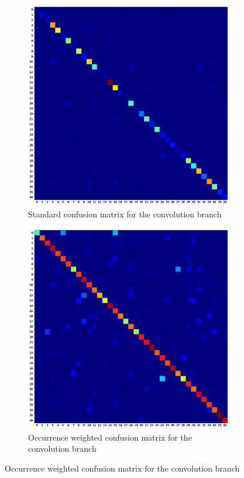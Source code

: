 \documentclass[12pt,letterpaper]{article}
\begin{document}
\begin{figure}[H]
	\begin{subfigure}[b]{0.45\textwidth}
	\centering
	\includegraphics[scale=0.18]{../FiguresMetrics/XValGammaCNN_Avg_Standard_Confusion}
	\caption{Standard confusion matrix for the convolution branch}
	\end{subfigure}
	\hfill
	\begin{subfigure}[b]{0.45\textwidth}
	\centering
	\includegraphics[scale=0.18]{../FiguresMetrics/XValGammaCNN_Avg_Hits_Weighted_Confusion}
	\caption{Occurrence weighted confusion matrix for the convolution branch}
	\end{subfigure}	


\end{figure}
\end{document}
